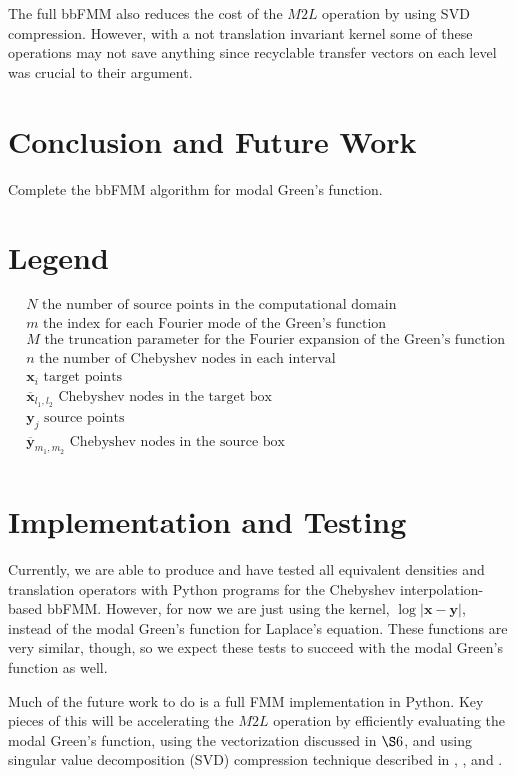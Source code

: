 \documentclass[11pt, oneside]{article}   	%
\begin{document}
The full bbFMM also reduces the cost of the $M2L$ operation by using SVD compression. However, with a not translation invariant kernel some of these operations may not save anything since recyclable transfer vectors on each level was crucial to their argument.

\section{Conclusion and Future Work}
Complete the bbFMM algorithm for modal Green's function.

\begin{appendices}
\section{Legend}
\begin{align*}
&N \mbox{ the number of source points in the computational domain}\\
&m \mbox{ the index for each Fourier mode of the Green's function}\\
&M \mbox{ the truncation parameter for the Fourier expansion of the Green's function}\\
&n \mbox{ the number of Chebyshev nodes in each interval}\\
&\mathbf{x}_i\mbox{ target points}\\
&\mathbf{\overline{x}}_{l_1,l_2}\mbox{ Chebyshev nodes in the target box}\\
&\mathbf{y}_j\mbox{ source points}\\
&\mathbf{\overline{y}}_{m_1,m_2}\mbox{ Chebyshev nodes in the source box}\\
\end{align*}


\section{Implementation and Testing}
Currently, we are able to produce and have tested all equivalent densities and translation operators with Python programs for the Chebyshev interpolation-based bbFMM. However, for now we are just using the kernel, $\log|\mathbf{x}-\mathbf{y}|$, instead of the modal Green's function for Laplace's equation. These functions are very similar, though, so we expect these tests to succeed with the modal Green's function as well.

Much of the future work to do is a full FMM implementation in Python. Key pieces of this will be accelerating the $M2L$ operation by efficiently evaluating the modal Green's function, using the vectorization discussed in $\S6$, and using singular value decomposition (SVD) compression technique described in \cite{CGMR}, \cite{FD}, \cite{ZGR} and \cite{MV}.


\end{appendices}
\end{document}
